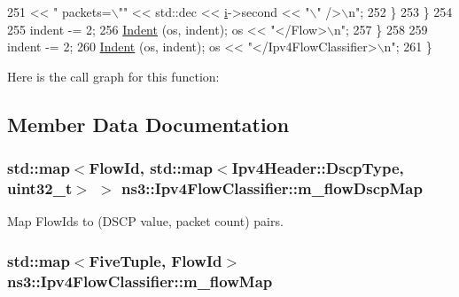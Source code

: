 \begin{DoxyCode}
251                  << \textcolor{stringliteral}{" packets=\(\backslash\)""} << std::dec << \hyperlink{bernuolliDistribution_8m_a6f6ccfcf58b31cb6412107d9d5281426}{i}->second << \textcolor{stringliteral}{"\(\backslash\)" />\(\backslash\)n"};
252             \}
253         \}
254 
255       indent -= 2;
256       \hyperlink{classns3_1_1FlowClassifier_adc5d8694d3c9059b5ac2c664e5897088}{Indent} (os, indent); os << \textcolor{stringliteral}{"</Flow>\(\backslash\)n"};
257     \}
258 
259   indent -= 2;
260   \hyperlink{classns3_1_1FlowClassifier_adc5d8694d3c9059b5ac2c664e5897088}{Indent} (os, indent); os << \textcolor{stringliteral}{"</Ipv4FlowClassifier>\(\backslash\)n"};
261 \}
\end{DoxyCode}


Here is the call graph for this function\+:




\subsection{Member Data Documentation}
\subsubsection[{\texorpdfstring{m\+\_\+flow\+Dscp\+Map}{m_flowDscpMap}}]{\setlength{\rightskip}{0pt plus 5cm}std\+::map$<${\bf Flow\+Id}, std\+::map$<${\bf Ipv4\+Header\+::\+Dscp\+Type}, uint32\+\_\+t$>$ $>$ ns3\+::\+Ipv4\+Flow\+Classifier\+::m\+\_\+flow\+Dscp\+Map\hspace{0.3cm}{\ttfamily [private]}}\hypertarget{classns3_1_1Ipv4FlowClassifier_ab4fecdf812fb864667d27d028e184784}{}\label{classns3_1_1Ipv4FlowClassifier_ab4fecdf812fb864667d27d028e184784}


Map Flow\+Ids to (D\+S\+CP value, packet count) pairs. 

\subsubsection[{\texorpdfstring{m\+\_\+flow\+Map}{m_flowMap}}]{\setlength{\rightskip}{0pt plus 5cm}std\+::map$<${\bf Five\+Tuple}, {\bf Flow\+Id}$>$ ns3\+::\+Ipv4\+Flow\+Classifier\+::m\+\_\+flow\+Map\hspace{0.3cm}{\ttfamily [private]}}\hypertarget{classns3_1_1Ipv4FlowClassifier_abd62b87d946068783f98976126e131b6}{}\label{classns3_1_1Ipv4FlowClassifier_abd62b87d946068783f98976126e131b6}


